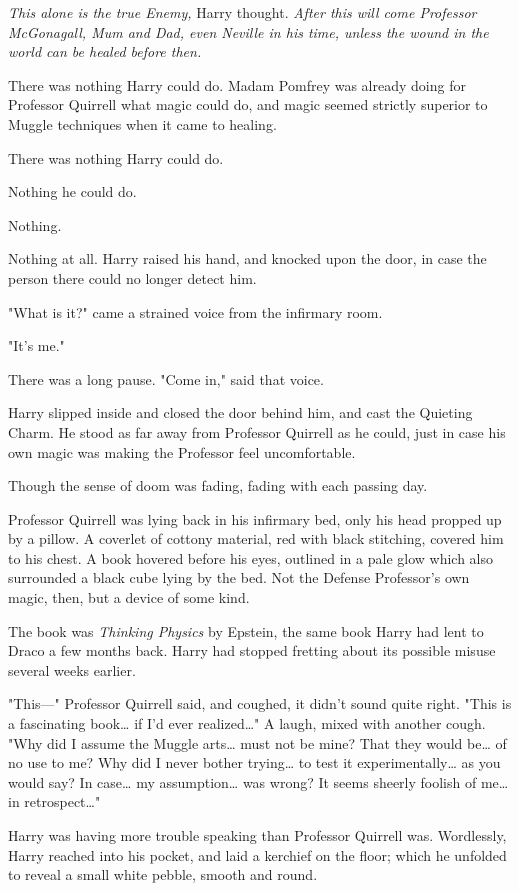 \emph{This alone is the true Enemy,} Harry thought. \emph{After this will come Professor McGonagall, Mum and Dad, even Neville in his time, unless the wound in the world can be healed before then.}

There was nothing Harry could do. Madam Pomfrey was already doing for Professor Quirrell what magic could do, and magic seemed strictly superior to Muggle techniques when it came to healing.

There was nothing Harry could do.

Nothing he could do.

Nothing.

Nothing at all.
\sbreak
Harry raised his hand, and knocked upon the door, in case the person there could no longer detect him.

"What is it?" came a strained voice from the infirmary room.

"It's me."

There was a long pause. "Come in," said that voice.

Harry slipped inside and closed the door behind him, and cast the Quieting Charm. He stood as far away from Professor Quirrell as he could, just in case his own magic was making the Professor feel uncomfortable.

Though the sense of doom was fading, fading with each passing day.

Professor Quirrell was lying back in his infirmary bed, only his head propped up by a pillow. A coverlet of cottony material, red with black stitching, covered him to his chest. A book hovered before his eyes, outlined in a pale glow which also surrounded a black cube lying by the bed. Not the Defense Professor's own magic, then, but a device of some kind.

The book was \emph{Thinking Physics} by Epstein, the same book Harry had lent to Draco a few months back. Harry had stopped fretting about its possible misuse several weeks earlier.

"This---" Professor Quirrell said, and coughed, it didn't sound quite right. "This is a fascinating book{\ldots} if I'd ever realized{\ldots}" A laugh, mixed with another cough. "Why did I assume the Muggle arts{\ldots} must not be mine? That they would be{\ldots} of no use to me? Why did I never bother trying{\ldots} to test it experimentally{\ldots} as you would say? In case{\ldots} my assumption{\ldots} was wrong? It seems sheerly foolish of me{\ldots} in retrospect{\ldots}"

Harry was having more trouble speaking than Professor Quirrell was. Wordlessly, Harry reached into his pocket, and laid a kerchief on the floor; which he unfolded to reveal a small white pebble, smooth and round.

